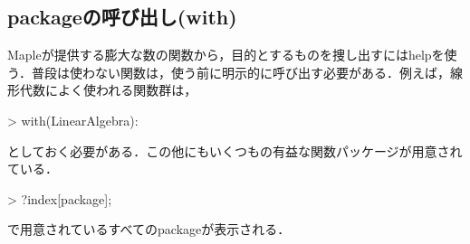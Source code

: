 \subsection{packageの呼び出し(with)}
Mapleが提供する膨大な数の関数から，目的とするものを捜し出すにはhelpを使う．普段は使わない関数は，使う前に明示的に呼び出す必要がある．例えば，線形代数によく使われる関数群は，
\begin{MapleInput}
> with(LinearAlgebra):
\end{MapleInput}
としておく必要がある．この他にもいくつもの有益な関数パッケージが用意されている．
\begin{MapleInput}
> ?index[package];
\end{MapleInput}
で用意されているすべてのpackageが表示される．

